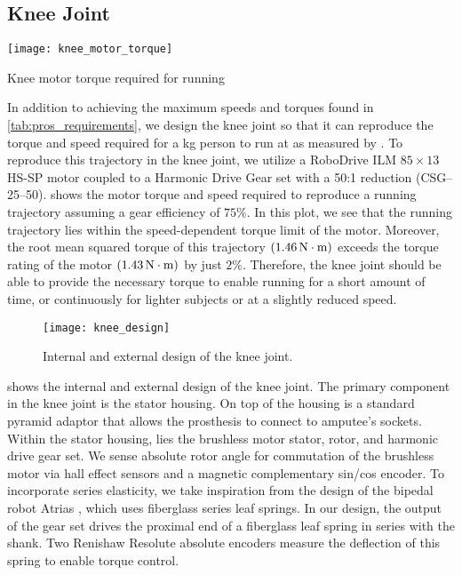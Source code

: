 \subsection{Knee Joint}
\begin{marginfigure}[2in]
    \centering 
    \texttt{[image: knee\_motor\_torque]}
    \caption{Knee motor torque required for
    running}\label{fig:knee_motor_torque}
\end{marginfigure}
In addition to achieving the maximum speeds and torques found in
\cref{tab:pros_requirements}, we design the knee joint so that it can reproduce
the torque and speed required for a \unit[80]{kg} person to run at
 as measured by \citet{novacheck1998biomechanics}. To
reproduce this trajectory in the knee joint, we utilize a RoboDrive ILM
$85\times13$ HS-SP motor coupled to a Harmonic Drive Gear set with a 50:1
reduction (CSG--25--50).  shows the motor torque
and speed required to reproduce a running trajectory assuming a gear
efficiency of $75\%$. In this plot, we see that the running trajectory lies
within the speed-dependent torque limit of the motor. Moreover, the root mean
squared torque of this trajectory $(\unit[1.46]{N \cdot m})$ exceeds the torque
rating of the motor $(\unit[1.43]{N \cdot m})$ by just $2\%$. Therefore, the
knee joint should be able to provide the necessary torque to enable running for
a short amount of time, or continuously for lighter subjects or at a slightly
reduced speed.

\begin{figure*}[t]
    \centering 
    \texttt{[image: knee\_design]}
    \caption{Internal and external design of the knee 
    joint.}\label{fig:knee_design}
\end{figure*}
 shows the internal and external design of the knee joint.
The primary component in the knee joint is the stator housing. On top of the
housing is a standard pyramid adaptor that allows the prosthesis to connect to
amputee's sockets. Within the stator housing, lies the brushless motor stator,
rotor, and harmonic drive gear set. We sense absolute rotor angle for
commutation of the brushless motor via hall effect sensors and a magnetic
complementary sin/cos encoder. To incorporate series elasticity, we take
inspiration from the design of the bipedal robot Atrias
\citep{grimes2013atrias}, which uses fiberglass series leaf springs. In our
design, the output of the gear set drives the proximal end of a fiberglass leaf
spring in series with the shank. Two Renishaw Resolute absolute encoders measure
the deflection of this spring to enable torque control.

